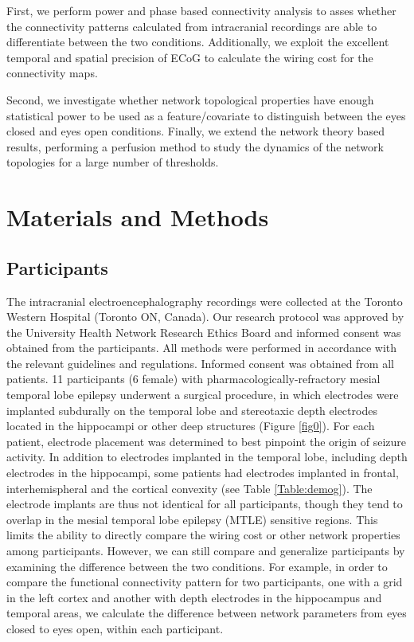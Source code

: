 \documentclass[11pt, onecolumn]{article}
\begin{document}
First, we perform power and phase based connectivity analysis to asses whether the connectivity patterns calculated from intracranial recordings are able to differentiate between the two conditions. Additionally, we exploit the excellent temporal and spatial precision of ECoG to calculate the wiring cost for the connectivity maps. 

Second, we investigate whether network topological properties have enough statistical power to be used as a feature/covariate to distinguish between the eyes closed and eyes open conditions. 
Finally, we extend the network theory based results,   performing a perfusion method to study the dynamics of the network topologies for a large number of thresholds.


\section{Materials and Methods}
\label{se:maandme}
\subsection{Participants}

The intracranial electroencephalography recordings were collected at the Toronto Western Hospital (Toronto ON, Canada). Our research protocol was approved by the University Health Network Research Ethics Board and informed consent was obtained from the participants. All methods were performed in accordance with the relevant guidelines and regulations. Informed consent was obtained from all patients.
11 participants (6 female) with pharmacologically-refractory mesial temporal lobe epilepsy underwent a surgical procedure, in which electrodes were implanted subdurally on the temporal lobe and stereotaxic depth electrodes located in the hippocampi or other deep structures (Figure \ref{fig0}).
For each patient, electrode placement was determined to
best pinpoint the origin of seizure activity. In addition to electrodes implanted in the temporal lobe, including depth electrodes in the hippocampi, some patients had electrodes implanted in frontal, interhemispheral and the cortical convexity (see Table \ref{Table:demog}). The electrode implants are thus not identical for all participants, though they tend to overlap in the mesial temporal lobe epilepsy (MTLE) sensitive regions. This limits the ability to directly compare the wiring cost or other network properties among participants. However, we can still compare and generalize participants by examining the difference between the two conditions. For example, in order to compare the functional connectivity pattern for two participants, one with a grid in the left cortex and another with depth electrodes in the hippocampus and temporal areas, we calculate the difference between network parameters from eyes closed to eyes open, within each participant.
\end{document}
